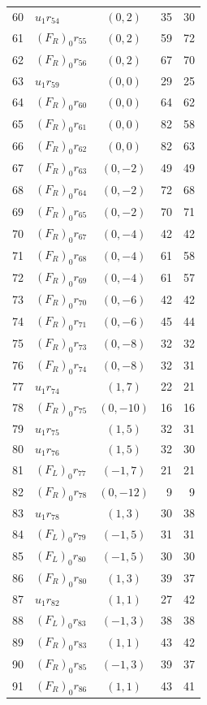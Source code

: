 \begin{longtable}{@{}rlcrr@{}}
60 & $u_1r_{54}$ & $(0,2)$ & 35 & 30\\
61 & $(F_R)_0r_{55}$ & $(0,2)$ & 59 & 72\\
62 & $(F_R)_0r_{56}$ & $(0,2)$ & 67 & 70\\
63 & $u_1r_{59}$ & $(0,0)$ & 29 & 25\\
64 & $(F_R)_0r_{60}$ & $(0,0)$ & 64 & 62\\
65 & $(F_R)_0r_{61}$ & $(0,0)$ & 82 & 58\\
66 & $(F_R)_0r_{62}$ & $(0,0)$ & 82 & 63\\
67 & $(F_R)_0r_{63}$ & $(0,-2)$ & 49 & 49\\
68 & $(F_R)_0r_{64}$ & $(0,-2)$ & 72 & 68\\
69 & $(F_R)_0r_{65}$ & $(0,-2)$ & 70 & 71\\
70 & $(F_R)_0r_{67}$ & $(0,-4)$ & 42 & 42\\
71 & $(F_R)_0r_{68}$ & $(0,-4)$ & 61 & 58\\
72 & $(F_R)_0r_{69}$ & $(0,-4)$ & 61 & 57\\
73 & $(F_R)_0r_{70}$ & $(0,-6)$ & 42 & 42\\
74 & $(F_R)_0r_{71}$ & $(0,-6)$ & 45 & 44\\
75 & $(F_R)_0r_{73}$ & $(0,-8)$ & 32 & 32\\
76 & $(F_R)_0r_{74}$ & $(0,-8)$ & 32 & 31\\
77 & $u_1r_{74}$ & $(1,7)$ & 22 & 21\\
78 & $(F_R)_0r_{75}$ & $(0,-10)$ & 16 & 16\\
79 & $u_1r_{75}$ & $(1,5)$ & 32 & 31\\
80 & $u_1r_{76}$ & $(1,5)$ & 32 & 30\\
81 & $(F_L)_0r_{77}$ & $(-1,7)$ & 21 & 21\\
82 & $(F_R)_0r_{78}$ & $(0,-12)$ & 9 & 9\\
83 & $u_1r_{78}$ & $(1,3)$ & 30 & 38\\
84 & $(F_L)_0r_{79}$ & $(-1,5)$ & 31 & 31\\
85 & $(F_L)_0r_{80}$ & $(-1,5)$ & 30 & 30\\
86 & $(F_R)_0r_{80}$ & $(1,3)$ & 39 & 37\\
87 & $u_1r_{82}$ & $(1,1)$ & 27 & 42\\
88 & $(F_L)_0r_{83}$ & $(-1,3)$ & 38 & 38\\
89 & $(F_R)_0r_{83}$ & $(1,1)$ & 43 & 42\\
90 & $(F_R)_0r_{85}$ & $(-1,3)$ & 39 & 37\\
91 & $(F_R)_0r_{86}$ & $(1,1)$ & 43 & 41\\

\end{longtable}
